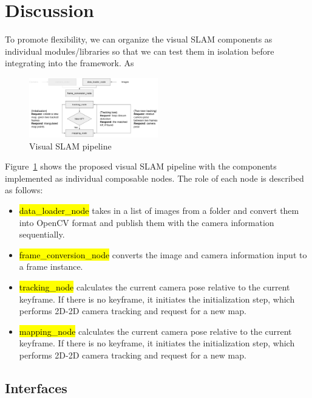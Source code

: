 \section{Discussion}
To promote flexibility, we can organize the visual SLAM components as individual modules/libraries so that we can test them in isolation before integrating into the framework. As

\begin{figure}[h]
    \centering
    \includegraphics[width=0.5\textwidth]{img/pipeline.png}
    \caption{Visual SLAM pipeline}
    \label{fig:vslam_pipeline}
\end{figure}

Figure~\ref{fig:vslam_pipeline} shows the proposed visual SLAM pipeline with the components implemented as individual composable nodes. 
The role of each node is described as follows:
\begin{itemize}
  \item \hl{data\_loader\_node} takes in a list of images from a folder and convert them into OpenCV format and publish them with the camera information sequentially.
  
  \item \hl{frame\_conversion\_node} converts the image and camera information input to a frame instance.
  
  \item \hl{tracking\_node} calculates the current camera pose relative to the current keyframe. If there is no keyframe, it initiates the initialization step, which performs 2D-2D camera tracking and request for a new map. 

  \item \hl{mapping\_node} calculates the current camera pose relative to the current keyframe. If there is no keyframe, it initiates the initialization step, which performs 2D-2D camera tracking and request for a new map. 

\end{itemize}

\subsection{Interfaces}


